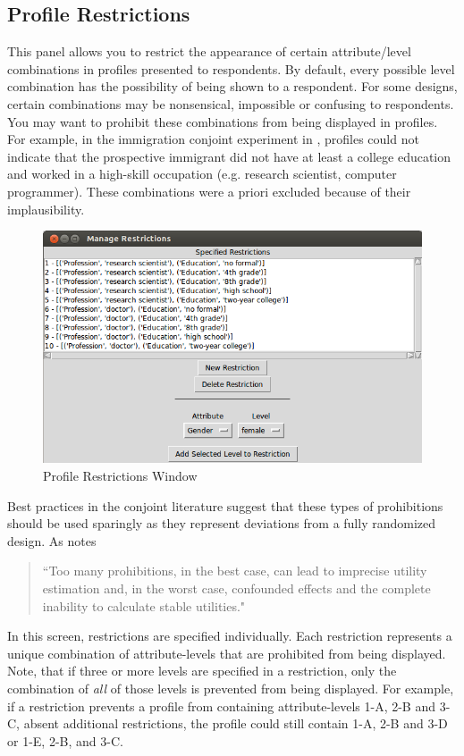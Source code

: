 \documentclass[12pt]{article}
\begin{document}
\subsection{Profile Restrictions}

This panel allows you to restrict the appearance of certain attribute/level combinations in profiles presented to respondents. By default, every possible level combination has the possibility of being shown to a respondent. For some designs, certain combinations may be nonsensical, impossible or confusing to respondents. You may want to prohibit these combinations from being displayed in profiles. For example, in the immigration conjoint experiment in \cite{hainmueller2013}, profiles could not indicate that the prospective immigrant did not have at least a college education and worked in a high-skill occupation (e.g. research scientist, computer programmer). These combinations were a priori excluded because of their implausibility.

\begin{figure}[ht!]
\centering\includegraphics[scale=.6]{graphics/restriction_screen.png}
\caption{Profile Restrictions Window}
\end{figure}

Best practices in the conjoint literature suggest that these types of prohibitions should be used sparingly as they represent deviations from a fully randomized design. As \cite{Orme2002} notes 
\begin{quote} 
``Too many prohibitions, in the best case, can lead to imprecise utility estimation and, in the worst case, confounded effects and the complete inability to calculate stable utilities."
\end{quote}

In this screen, restrictions are specified individually. Each restriction represents a unique combination of attribute-levels that are prohibited from being displayed. Note, that if three or more levels are specified in a restriction, only the combination of \emph{all} of those levels is prevented from being displayed. For example, if a restriction prevents a profile from containing attribute-levels 1-A, 2-B and 3-C, absent additional restrictions, the profile could still contain 1-A, 2-B and 3-D or 1-E, 2-B, and 3-C.   
\end{document}
